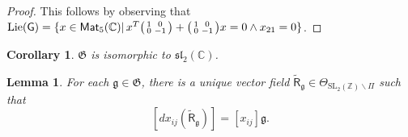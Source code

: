 \documentclass{article}
\numberwithin{equation}{section}
\numberwithin{figure}{section}
\theoremstyle{plain}
\newtheorem{lemma}[theorem]{Lemma}
\newtheorem{corollary}[theorem]{Corollary}
\theoremstyle{definition}
\numberwithin{equation}{section}
\newtheorem[S, bodystyle=\normalfont\noindent]{defiS}{Definition}[section]
\begin{document}
\begin{proof}
This follows by observing that $\text{Lie}(\mathsf{G})=\{x\in \mathsf{Mat}_{5}(\mathbb{C})|\,x^T \begin{psmallmatrix} 1 & 0 \\ 0& -1\end{psmallmatrix}+\begin{psmallmatrix} 1 & 0 \\ 0& -1\end{psmallmatrix}x=0\land x_{21}=0\}$. 
\end{proof}

\begin{corollary}$\mathfrak{G}$ is isomorphic to $\mathfrak{sl}_2(\mathbb{C})$.
\end{corollary}
\begin{lemma} For each $\mathfrak{g}\in \mathfrak{G}$, there is a unique vector field $\tilde{\mathsf{R}}_{\mathfrak{g}}\in\Theta_{\text{SL}_2(\mathbb{Z})\backslash\mathsf{\Pi}}$ such that
\begin{equation}\label{elip}
[dx_{ij}(\tilde{\mathsf{R}}_{\mathfrak{g}})]=[x_{ij}]\mathfrak{g}.
\end{equation}
\end{lemma}
\end{document}
